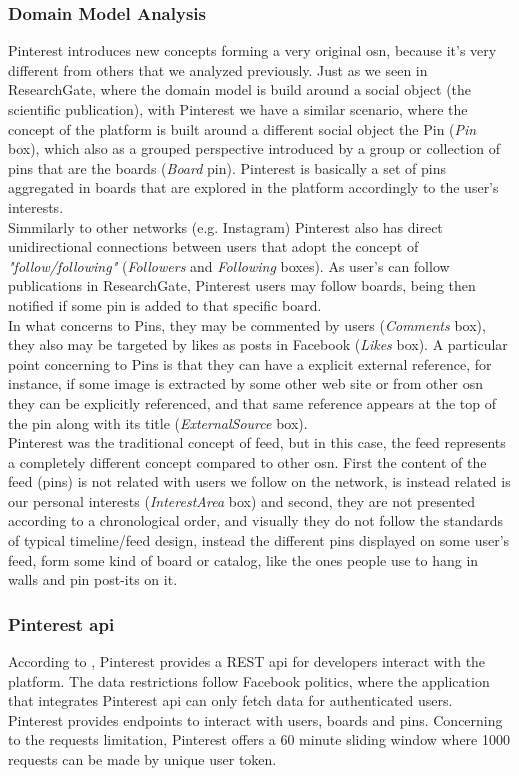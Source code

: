 \subsubsection*{Domain Model Analysis}
Pinterest introduces new concepts forming a very original \gls{osn}, because it's very different from others that we analyzed previously. Just as we seen in ResearchGate, where the domain model is build around a social object (the scientific publication), with Pinterest we have a similar scenario, where the concept of the platform is built around a different social object the Pin (\textit{Pin} box), which also as a grouped perspective introduced by a group or collection of pins that are the boards (\textit{Board} pin). Pinterest is basically a set of pins aggregated in boards that are explored in the platform accordingly to the user's interests.\\
\indent Simmilarly to other networks (e.g. Instagram) Pinterest also has direct unidirectional connections between users that adopt the concept of \textit{"follow/following"} (\textit{Followers} and \textit{Following} boxes). As user's can follow publications in ResearchGate, Pinterest users may follow boards, being then notified if some pin is added to that specific board.\\
\indent In what concerns to Pins, they may be commented by users (\textit{Comments} box), they also may be targeted by likes as posts in Facebook (\textit{Likes} box). A particular point concerning to Pins is that they can have a explicit external reference, for instance, if some image is extracted by some other web site or from other \gls{osn} they can be explicitly referenced, and that same reference appears at the top of the pin along with its title (\textit{ExternalSource} box).\\
\indent Pinterest was the traditional concept of feed, but in this case, the feed represents a completely different concept compared to other \gls{osn}. First the content of the feed (pins) is not related with users we follow on the network, is instead related is our personal interests (\textit{InterestArea} box) and second, they are not presented according to a chronological order, and visually they do not follow the standards of typical timeline/feed design, instead the different pins displayed on some user's feed, form some kind of board or catalog, like the ones people use to hang in walls and pin post-its on it.

\subsubsection*{Pinterest \gls{api}}
According to \citep{pintdev}, Pinterest provides a REST \gls{api} for developers interact with the platform. The data restrictions follow Facebook politics, where the application that integrates Pinterest \gls{api} can only fetch data for authenticated users. Pinterest provides endpoints to interact with users, boards and pins. Concerning to the requests limitation, Pinterest offers a 60 minute sliding window where 1000 requests can be made by unique user token.

